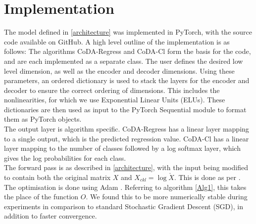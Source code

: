 




\section{Implementation}
\label{implementation}
The model defined in \ref{architecture} was implemented in PyTorch, with the source code available on GitHub. A high level outline of the implementation is as follows: The algorithms CoDA-Regress and CoDA-Cl form the basis for the code, and are each implemented as a separate class. The user defines the desired low level dimension, as well as the encoder and decoder dimensions. Using these parameters, an ordered dictionary is used to stack the layers for the encoder and decoder to ensure the correct ordering of dimensions. This includes the nonlinearities, for which we use Exponential Linear Units (ELUs). These dictionaries are then used as input to the  PyTorch Sequential module to format them as PyTorch objects. \\

The output layer is algorithm specific. CoDA-Regress has a linear layer mapping to a single output, which is the predicted regression value. CoDA-Cl has a linear layer mapping to the number of classes followed by a log softmax layer, which gives the log probabilities for each class. \\

The forward pass is as described in \ref{architecture}, with the input being modified to contain both the original matrix $X$ and $X_{ckl} = \log \check{X}$. This is done as per \cite{Avalos2018}. \\

The optimisation is done using Adam \citep{}. Referring to algorithm \ref{Alg1}, this takes the place of the function $O$. We found this to be more numerically stable during experiments in comparison to standard Stochastic Gradient Descent (SGD), in addition to faster convergence. 

